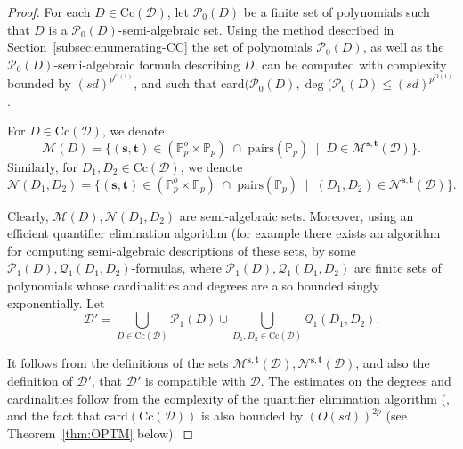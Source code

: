 \documentclass{amsart}[10pts]
\theoremstyle{definition}
\theoremstyle{remark}
\theoremstyle{observation}
\numberwithin{equation}{section}
\newcommand {\PP}     {\mathbb{P}} %
\newcommand{\card}{\mathrm{card}}
\newcommand{\Cc}{\mathrm{Cc}}
\newcommand{\Pairs}{\mathrm{pairs}}
\begin{document}
\begin{proof}
For each $D \in \Cc(\mathcal{D})$, let $\mathcal{P}_0(D)$ be a finite set of polynomials such that $D$ is a $\mathcal{P}_0(D)$-semi-algebraic set.
    Using the method described  in Section~\ref{subsec:enumerating-CC} the set of polynomials $\mathcal{P}_0(D)$,  as well as the $\mathcal{P}_0(D)$-semi-algebraic formula describing $D$, can be computed with complexity bounded by $(s d)^{p^{O(1)}}$, and such that $\card(\mathcal{P}_0(D), \deg(\mathcal{P}_0(D) \leq (s d)^{p^{O(1)}}$.

For $D \in \Cc(\mathcal{D})$, we denote 
\[
\mathcal{M}(D) = \{(\mathbf s, \mathbf t) \in (\PP_p^o \times \PP_p) \;\cap \; \Pairs(\PP_p)\; \mid\; D \in \mathcal{M}^{\mathbf s, \mathbf t}(\mathcal{D}) \}.
\]
Similarly,  for $D_1,D_2 \in \Cc(\mathcal{D})$, we denote 
\[
\mathcal{N}(D_1,D_2) = \{(\mathbf s, \mathbf t) \in (\PP_p^o \times \PP_p) \;\cap \; \Pairs(\PP_p)\; \mid\; (D_1,D_2) \in \mathcal{N}^{\mathbf s, \mathbf t}(\mathcal{D}) \}.
\]

Clearly, $\mathcal{M}(D),\mathcal{N}(D_1,D_2)$ are semi-algebraic sets. Moreover, using an efficient quantifier elimination algorithm (for example \cite[Algorithm 14.5 (Quantifier Elimination)]{BPRbook2} there exists an algorithm for computing semi-algebraic descriptions of these sets,
by some $\mathcal{P}_1(D), \mathcal{Q}_1(D_1,D_2)$-formulas, where 
$\mathcal{P}_1(D), \mathcal{Q}_1(D_1,D_2)$ are finite sets of  polynomials
whose cardinalities and degrees  are also  bounded singly exponentially.
Let 
\[
\mathcal{D}' = \bigcup_{D \in \Cc(\mathcal{D})} \mathcal{P}_1(D) \cup \bigcup_{D_1,D_2 \in \Cc(\mathcal{D})} \mathcal{Q}_1(D_1,D_2).
\]

It follows from the definitions of the sets 
$
\mathcal M^{\mathbf s,\mathbf t}(\mathcal D),
\mathcal N^{\mathbf s,\mathbf t}(\mathcal D)
$,
and also the definition of $\mathcal{D}'$, that $\mathcal{D}'$ is compatible with $\mathcal{D}$. The estimates on the degrees and cardinalities follow from the 
complexity of the quantifier elimination algorithm (\cite[Algorithm 14.5 (Quantifier Elimination)]{BPRbook2}, and the fact that $\card(\Cc(\mathcal{D}))$ is also bounded by $(O(s d))^{2 p}$ (see Theorem~\ref{thm:OPTM} below).
\end{proof}
\end{document}
